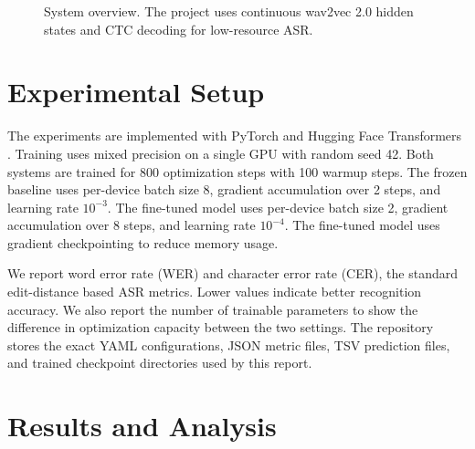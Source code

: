 \documentclass{article}
\begin{document}
\begin{figure}[t]
\centering
{}
\caption{System overview. The project uses continuous wav2vec 2.0 hidden states and CTC decoding for low-resource ASR.}
\label{fig:pipeline}
\end{figure}

\section{Experimental Setup}
\label{sec:setup}

The experiments are implemented with PyTorch and Hugging Face Transformers \cite{wolf2020transformers}. Training uses mixed precision on a single GPU with random seed 42. Both systems are trained for 800 optimization steps with 100 warmup steps. The frozen baseline uses per-device batch size 8, gradient accumulation over 2 steps, and learning rate $10^{-3}$. The fine-tuned model uses per-device batch size 2, gradient accumulation over 8 steps, and learning rate $10^{-4}$. The fine-tuned model uses gradient checkpointing to reduce memory usage.

We report word error rate (WER) and character error rate (CER), the standard edit-distance based ASR metrics. Lower values indicate better recognition accuracy. We also report the number of trainable parameters to show the difference in optimization capacity between the two settings. The repository stores the exact YAML configurations, JSON metric files, TSV prediction files, and trained checkpoint directories used by this report.

\section{Results and Analysis}
\label{sec:results}
\end{document}
